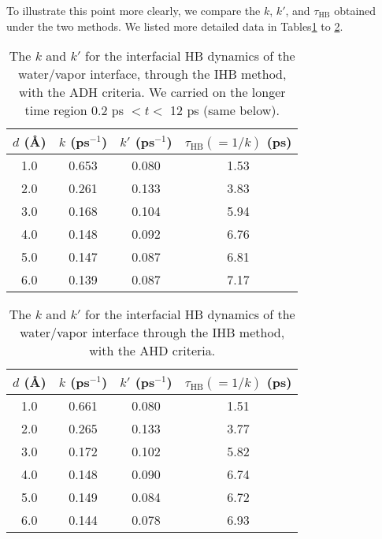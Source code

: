 %
To illustrate this point more clearly, we compare the $k$, $k'$, and $\tau_\text{HB}$ obtained under the two methods.
We listed more detailed data in Tables\thinspace\ref{tab:k_k_prime_tau_128w_pure_ihb_ADH} to \ref{tab:k_k_prime_tau_128w_pure_ihb_AHD}.
\begin{table}[H]%
\centering
\caption{\label{tab:k_k_prime_tau_128w_pure_ihb_ADH} 
    The $k$ and $k'$ for the interfacial HB dynamics of the water/vapor interface, through the IHB method, with the ADH criteria. 
We carried on the longer time region 0.2 ps $< t <$ 12 ps (same below). 
}
\begin{tabular}{cccc}
 $d$ (\AA) & $k$ (ps$^{-1}$) & $k'$ (ps$^{-1}$)& $\tau_{\text{HB}} (=1/k)$ (ps) \\
\hline
  1.0 & 0.653 & 0.080 & 1.53  \\
  2.0 & 0.261 & 0.133 & 3.83  \\
  3.0 & 0.168 & 0.104 & 5.94  \\
  4.0 & 0.148 & 0.092 & 6.76  \\
  5.0 & 0.147 & 0.087 & 6.81  \\
  6.0 & 0.139 & 0.087 & 7.17  \\
\end{tabular}
\end{table}
\begin{table}[htb]
\centering
\caption{\label{tab:k_k_prime_tau_128w_pure_ihb_AHD} 
    The $k$ and $k'$ for the interfacial HB dynamics of the water/vapor interface through the IHB method, with the AHD criteria.} 
\begin{tabular}{cccc}
 $d$ (\AA) & $k$ (ps$^{-1}$) & $k'$ (ps$^{-1}$) & $\tau_{\text{HB}} (=1/k)$ (ps) \\
\hline
  1.0 & 0.661 & 0.080 & 1.51  \\
  2.0 & 0.265 & 0.133 & 3.77  \\
  3.0 & 0.172 & 0.102 & 5.82  \\
  4.0 & 0.148 & 0.090 & 6.74  \\
  5.0 & 0.149 & 0.084 & 6.72  \\
  6.0 & 0.144 & 0.078 & 6.93  \\
\end{tabular}
\end{table}

